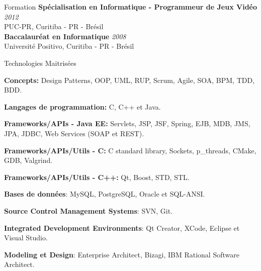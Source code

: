 \documentclass{resume}
\begin{document}
  \begin{rSection}{Formation}
    {\bf Spécialisation en Informatique - Programmeur de Jeux Vidéo } \hfill {\em 2012} \\
    {PUC-PR, Curitiba - PR - Brésil} \\ 

    {\bf Baccalauréat en Informatique } \hfill {\em 2008} \\
    {Université Positivo, Curitiba - PR - Brésil}   
  \end{rSection}
  
  \begin{rSection}{Technologies Maitrisées}
    \begin{rSubsection}{}{}{}{}
      \item {\bf Concepts:} Design Patterns, OOP, UML, RUP, Scrum, Agile, SOA, BPM, TDD, BDD.
      \item {\bf Langages de programmation:} C, C++ et Java.
      \item {\bf Frameworks/APIs - Java EE:} Servlets, JSP, JSF, Spring, EJB, MDB, JMS, JPA, JDBC, Web Services (SOAP et REST).
      \item {\bf Frameworks/APIs/Utils - C:} C standard library, Sockets, p\_threads, CMake, GDB, Valgrind.
      \item {\bf Frameworks/APIs/Utils - C++:} Qt, Boost, STD, STL.
      \item {\bf Bases de données}: MySQL, PostgreSQL, Oracle et SQL-ANSI.
      \item {\bf Source Control Management Systems}: SVN, Git.
      \item {\bf Integrated Development Environments}: Qt Creator, XCode, Eclipse et Visual Studio.
      \item {\bf Modeling et Design}: Enterprise Architect, Bizagi, IBM Rational Software Architect.
    \end{rSubsection}
  \end{rSection}
\end{document}
